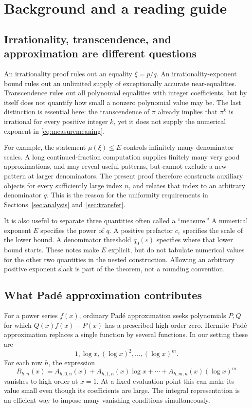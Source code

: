 \section{Background and a reading guide}
\label{sec:background}

\subsection{Irrationality, transcendence, and approximation are different questions}

An irrationality proof rules out an equality \(\xi=p/q\).
An irrationality-exponent bound rules out an unlimited supply of
exceptionally accurate near-equalities. Transcendence rules out all
polynomial equalities with integer coefficients, but by itself does
not quantify how small a nonzero polynomial value may be. The last
distinction is essential here: the transcendence of \(\pi\) already
implies that \(\pi^k\) is irrational for every positive integer \(k\),
yet it does not supply the numerical exponent in
\eqref{eq:measuremeaning}.

For example, the statement \(\mu(\xi)\le E\) controls infinitely many
denominator scales. A long continued-fraction computation supplies
finitely many very good approximations, and may reveal useful
patterns, but cannot exclude a new pattern at larger denominators.
The present proof therefore constructs auxiliary objects for every
sufficiently large index \(n\), and relates that index to an arbitrary
denominator \(q\). This is the reason for the uniformity requirements
in Sections~\ref{sec:analysis} and~\ref{sec:transfer}.

It is also useful to separate three quantities often called a
``measure.'' A numerical exponent \(E\) specifies the power of \(q\).
A positive prefactor \(c_\varepsilon\) specifies the scale of the lower
bound. A denominator threshold \(q_0(\varepsilon)\) specifies where
that lower bound starts. These notes make \(E\) explicit, but do not
tabulate numerical values for the other two quantities in the nested
construction. Allowing an arbitrary positive exponent slack is part
of the theorem, not a rounding convention.

\subsection{What Pad\'e approximation contributes}

For a power series \(f(x)\), ordinary Pad\'e approximation seeks
polynomials \(P,Q\) for which \(Q(x)f(x)-P(x)\) has a prescribed
high-order zero. Hermite--Pad\'e approximation replaces a single
function by several functions. In our setting these are
\[
1,\log x,(\log x)^2,\ldots,(\log x)^m.
\]
For each row \(h\), the expression
\[
R_{h,n}(x)=A_{h,0,n}(x)+A_{h,1,n}(x)\log x
 +\cdots+A_{h,m,n}(x)(\log x)^m
\]
vanishes to high order at \(x=1\). At a fixed evaluation point this
can make its value small even though its coefficients are large.
The integral representation is an efficient way to impose many
vanishing conditions simultaneously.

